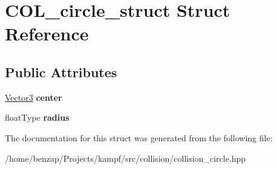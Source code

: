 \hypertarget{structCOL__circle__struct}{\section{C\-O\-L\-\_\-circle\-\_\-struct Struct Reference}
\label{structCOL__circle__struct}
}
\subsection*{Public Attributes}
\begin{DoxyCompactItemize}
\item 
\hypertarget{structCOL__circle__struct_a8514f6db8a0e2c44662b0db9632207a3}{\hyperlink{classVector3}{Vector3} {\bfseries center}}\label{structCOL__circle__struct_a8514f6db8a0e2c44662b0db9632207a3}

\item 
\hypertarget{structCOL__circle__struct_a70150dc7a48af3b2a68a4ff587f17786}{float\-Type {\bfseries radius}}\label{structCOL__circle__struct_a70150dc7a48af3b2a68a4ff587f17786}

\end{DoxyCompactItemize}


The documentation for this struct was generated from the following file\-:\begin{DoxyCompactItemize}
\item 
/home/benzap/\-Projects/kampf/src/collision/collision\-\_\-circle.\-hpp\end{DoxyCompactItemize}
